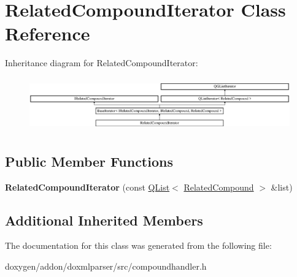 \hypertarget{class_related_compound_iterator}{}\section{Related\+Compound\+Iterator Class Reference}
\label{class_related_compound_iterator}
Inheritance diagram for Related\+Compound\+Iterator\+:\begin{figure}[H]
\begin{center}
\leavevmode
\includegraphics[height=2.323651cm]{class_related_compound_iterator}
\end{center}
\end{figure}
\subsection*{Public Member Functions}
\begin{DoxyCompactItemize}
\item 
\mbox{\label{class_related_compound_iterator_a7307c0f7c9f69b7df3808d992b5c196b}} 
{\bfseries Related\+Compound\+Iterator} (const \mbox{\hyperlink{class_q_list}{Q\+List}}$<$ \mbox{\hyperlink{class_related_compound}{Related\+Compound}} $>$ \&list)
\end{DoxyCompactItemize}
\subsection*{Additional Inherited Members}


The documentation for this class was generated from the following file\+:\begin{DoxyCompactItemize}
\item 
doxygen/addon/doxmlparser/src/compoundhandler.\+h\end{DoxyCompactItemize}
